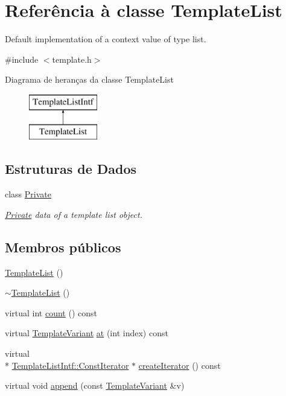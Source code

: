 \hypertarget{class_template_list}{\section{Referência à classe Template\-List}
\label{class_template_list}
}


Default implementation of a context value of type list.  




{\ttfamily \#include $<$template.\-h$>$}

Diagrama de heranças da classe Template\-List\begin{figure}[H]
\begin{center}
\leavevmode
\includegraphics[height=2.000000cm]{class_template_list}
\end{center}
\end{figure}
\subsection*{Estruturas de Dados}
\begin{DoxyCompactItemize}
\item 
class \hyperlink{class_template_list_1_1_private}{Private}
\begin{DoxyCompactList}\small\item\em \hyperlink{class_template_list_1_1_private}{Private} data of a template list object. \end{DoxyCompactList}\end{DoxyCompactItemize}
\subsection*{Membros públicos}
\begin{DoxyCompactItemize}
\item 
\hyperlink{class_template_list_a629ff5f7cee836815c3469d3fd5ac95a}{Template\-List} ()
\item 
\hyperlink{class_template_list_a4227e13976a4d7cfa732e0da239effc4}{$\sim$\-Template\-List} ()
\item 
virtual int \hyperlink{class_template_list_a0745638c9967e2ed90bc96c012288c55}{count} () const 
\item 
virtual \hyperlink{class_template_variant}{Template\-Variant} \hyperlink{class_template_list_a55f90d50fcb1378b2a97b9c3ad5bb162}{at} (int index) const 
\item 
virtual \\*
\hyperlink{class_template_list_intf_1_1_const_iterator}{Template\-List\-Intf\-::\-Const\-Iterator} $\ast$ \hyperlink{class_template_list_a0b1d6dedc3f51750e5cba18f51022f10}{create\-Iterator} () const 
\item 
virtual void \hyperlink{class_template_list_ae397f134138d43c6c737eebb4b25333f}{append} (const \hyperlink{class_template_variant}{Template\-Variant} \&v)
\end{DoxyCompactItemize}
